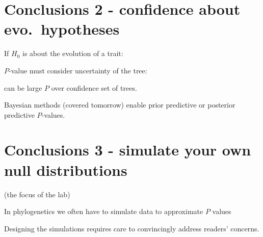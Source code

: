 \documentclass[landscape]{foils}
\begin{document}
\myNewSlide
\section*{Conclusions 2 - confidence about evo.~hypotheses}
If $H_0$ is about the evolution of a trait:
\begin{compactenum}
	\item $P$-value must consider uncertainty of the tree:
	\begin{compactitem}
		\item can be large $P$ over confidence set of trees.
		\item Bayesian methods (covered tomorrow) enable prior predictive or posterior predictive $P$-values.
	\end{compactitem}
\end{compactenum}

\myNewSlide
\section*{Conclusions 3 - simulate your own null distributions}
(the focus of the lab)
\begin{compactenum}
	\item In phylogenetics we often have to simulate data to approximate $P$ values 
	\item Designing the simulations requires care to convincingly address readers' concerns.
\end{compactenum}
\end{document}

